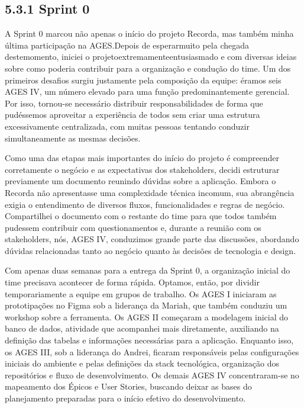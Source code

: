 \hypertarget{__RefHeading___Toc4845_3118176633}{}
\subsection*{5.3.1 Sprint 0}
\label{ages-iv:text-h-0116}

\indent A Sprint 0 marcou não apenas o início do projeto Recorda, mas também minha última participação na AGES.\originalspace{}Depois de esperar\originalspace{}muito pela chegada deste\originalspace{}momento, iniciei o projeto\originalspace{}extremamente\originalspace{}entusiasmado e com diversas ideias sobre como poderia contribuir para a organização e condução do time. Um dos primeiros desafios surgiu justamente pela composição da equipe: éramos seis AGES IV, um número elevado para uma função predominantemente gerencial. Por isso, tornou-se necessário distribuir responsabilidades de forma que pudéssemos aproveitar a experiência de todos sem criar uma estrutura excessivamente centralizada, com muitas pessoas tentando conduzir simultaneamente as mesmas decisões.\par

\indent Como uma das etapas mais importantes do início do projeto é compreender corretamente o negócio e as expectativas dos stakeholders, decidi estruturar previamente um documento reunindo dúvidas sobre a aplicação. Embora o Recorda não apresentasse uma complexidade técnica incomum, sua abrangência exigia o entendimento de diversos fluxos, funcionalidades e regras de negócio. Compartilhei o documento com o restante do time para que todos também pudessem contribuir com questionamentos e, durante a reunião com os stakeholders, nós, AGES IV, conduzimos grande parte das discussões, abordando dúvidas relacionadas tanto ao negócio quanto às decisões de tecnologia e design.\par

\indent Com apenas duas semanas para a entrega da Sprint 0, a organização inicial do time precisava acontecer de forma rápida. Optamos, então, por dividir temporariamente a equipe em grupos de trabalho. Os AGES I iniciaram as prototipações no Figma sob a liderança da Mariah, que também conduziu um workshop sobre a ferramenta. Os AGES II começaram a modelagem inicial do banco de dados, atividade que acompanhei mais diretamente, auxiliando na definição das tabelas e informações necessárias para a aplicação. Enquanto isso, os AGES III, sob a liderança do Andrei, ficaram responsáveis pelas configurações iniciais do ambiente e pelas definições da stack tecnológica, organização dos repositórios e fluxo de desenvolvimento. Os demais AGES IV concentraram-se no mapeamento dos Épicos e User Stories, buscando deixar as bases do planejamento preparadas para o início efetivo do desenvolvimento.\par

